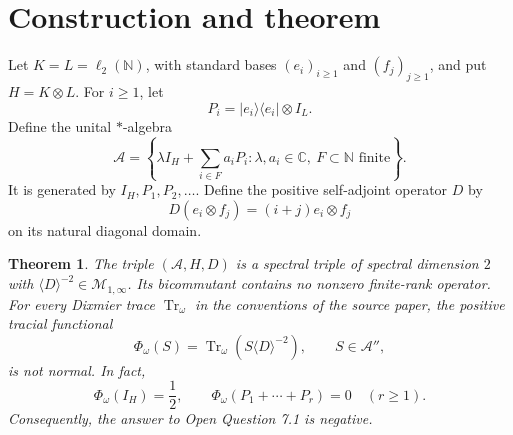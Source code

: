 \documentclass[11pt]{article}
\newtheorem{theorem}{Theorem}
\newcommand{\A}{\mathcal A}
\newcommand{\M}{\mathcal M}
\newcommand{\Tr}{\operatorname{Tr}}
\newcommand{\N}{\mathbb N}
\begin{document}
\section{Construction and theorem}

Let $K=L=\ell_2(\N)$, with standard bases $(e_i)_{i\geq1}$ and
$(f_j)_{j\geq1}$, and put $H=K\otimes L$.  For $i\geq1$, let
\[
 P_i=|e_i\rangle\langle e_i|\otimes I_L.
\]
Define the unital $*$-algebra
\[
 \A=\left\{\lambda I_H+\sum_{i\in F}a_iP_i:
       \lambda,a_i\in\mathbb C,\ F\subset\N\text{ finite}\right\}.
\]
It is generated by $I_H,P_1,P_2,\ldots$.  Define the positive self-adjoint
operator $D$ by
\[
 D(e_i\otimes f_j)=(i+j)e_i\otimes f_j
\]
on its natural diagonal domain.

\begin{theorem}\label{thm:main}
The triple $(\A,H,D)$ is a spectral triple of spectral dimension $2$ with
$\langle D\rangle^{-2}\in\M_{1,\infty}$.  Its bicommutant contains no
nonzero finite-rank operator.  For every Dixmier trace $\Tr_\omega$ in the
conventions of the source paper, the positive tracial functional
\[
 \Phi_\omega(S)=\Tr_\omega(S\langle D\rangle^{-2}),
 \qquad S\in\A'',
\]
is not normal.  In fact,
\[
 \Phi_\omega(I_H)=\frac12,
 \qquad
 \Phi_\omega(P_1+\cdots+P_r)=0\quad(r\geq1).
\]
Consequently, the answer to Open Question 7.1 is negative.
\end{theorem}
\end{document}
